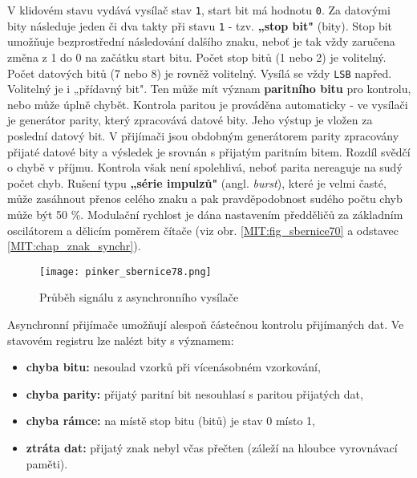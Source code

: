         V klidovém stavu vydává vysílač stav \texttt{1}, start bit má hodnotu \texttt{0}. Za 
        datovými bity následuje jeden či dva takty při stavu \texttt{1} - tzv. \textbf{„stop bit"} 
        (bity). Stop bit umožňuje bezprostřední následování dalšího znaku, neboť je tak vždy 
        zaručena změna z 1 do 0 na začátku start bitu. Počet stop bitů (1 nebo 2) je volitelný. 
        Počet datových bitů (7 nebo 8) je rovněž volitelný. Vysílá se vždy \texttt{LSB} napřed. 
        Volitelný je i „přídavný bit". Ten může mít význam \textbf{paritního bitu} pro kontrolu, 
        nebo může úplně chybět. Kontrola paritou je prováděna automaticky - ve vysílači je 
        generátor parity, který zpracovává datové bity. Jeho výstup je vložen za poslední datový 
        bit. V přijímači jsou obdobným generátorem parity zpracovány přijaté datové bity a 
        výsledek je srovnán s přijatým paritním bitem. Rozdíl svědčí o chybě v příjmu. Kontrola 
        však není spolehlivá, neboť parita nereaguje na sudý počet chyb. Rušení typu \textbf{„série 
        impulzů"} (angl. \emph{burst}), které je velmi časté, může zasáhnout přenos celého znaku a 
        pak pravděpodobnost sudého počtu chyb může být 50 \%. Modulační rychlost je dána nastavením 
        předděličů za základním oscilátorem a dělicím poměrem čítače (viz obr. 
        \ref{MIT:fig_sbernice70} a odstavec \ref{MIT:chap_znak_synchr}).
      
        \begin{figure}[ht!] %
          \centering
          \texttt{[image: pinker\_sbernice78.png]}
          \caption{Průběh signálu z asynchronního vysílače}
          \label{MIT:fig_sbernice78}
        \end{figure}
        
        Asynchronní přijímače umožňují alespoň částečnou kontrolu přijímaných dat. Ve stavovém 
        registru lze nalézt bity s významem:
        \begin{itemize}\addtolength{\itemsep}{-0.5\baselineskip}
          \item \textbf{chyba bitu:} nesoulad vzorků při vícenásobném vzorkování,
          \item \textbf{chyba parity:} přijatý paritní bit nesouhlasí s paritou přijatých dat,
          \item \textbf{chyba rámce:} na místě stop bitu (bitů) je stav 0 místo 1,
          \item \textbf{ztráta dat:} přijatý znak nebyl včas přečten (záleží na hloubce vyrovnávací 
                 paměti).          
        \end{itemize}
        
